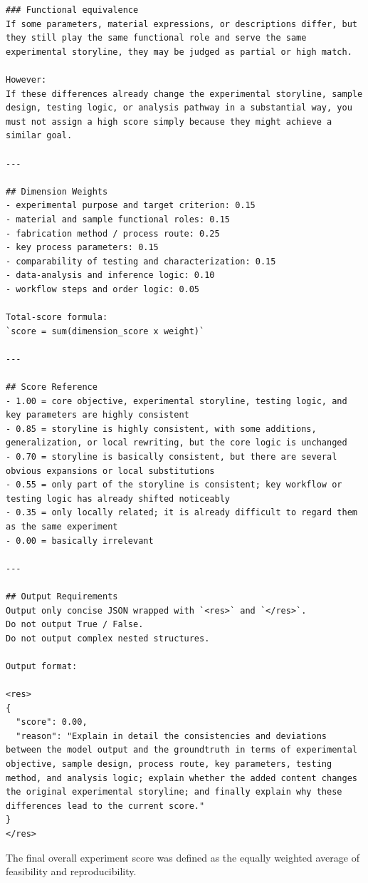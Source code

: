 \begin{lstlisting}[style=jsonstyle]
### Functional equivalence
If some parameters, material expressions, or descriptions differ, but they still play the same functional role and serve the same experimental storyline, they may be judged as partial or high match.

However:
If these differences already change the experimental storyline, sample design, testing logic, or analysis pathway in a substantial way, you must not assign a high score simply because they might achieve a similar goal.

---

## Dimension Weights
- experimental purpose and target criterion: 0.15
- material and sample functional roles: 0.15
- fabrication method / process route: 0.25
- key process parameters: 0.15
- comparability of testing and characterization: 0.15
- data-analysis and inference logic: 0.10
- workflow steps and order logic: 0.05

Total-score formula:
`score = sum(dimension_score x weight)`

---

## Score Reference
- 1.00 = core objective, experimental storyline, testing logic, and key parameters are highly consistent
- 0.85 = storyline is highly consistent, with some additions, generalization, or local rewriting, but the core logic is unchanged
- 0.70 = storyline is basically consistent, but there are several obvious expansions or local substitutions
- 0.55 = only part of the storyline is consistent; key workflow or testing logic has already shifted noticeably
- 0.35 = only locally related; it is already difficult to regard them as the same experiment
- 0.00 = basically irrelevant

---

## Output Requirements
Output only concise JSON wrapped with `<res>` and `</res>`.
Do not output True / False.
Do not output complex nested structures.

Output format:

<res>
{
  "score": 0.00,
  "reason": "Explain in detail the consistencies and deviations between the model output and the groundtruth in terms of experimental objective, sample design, process route, key parameters, testing method, and analysis logic; explain whether the added content changes the original experimental storyline; and finally explain why these differences lead to the current score."
}
</res>
\end{lstlisting}

The final overall experiment score was defined as the equally weighted average of feasibility and reproducibility.

